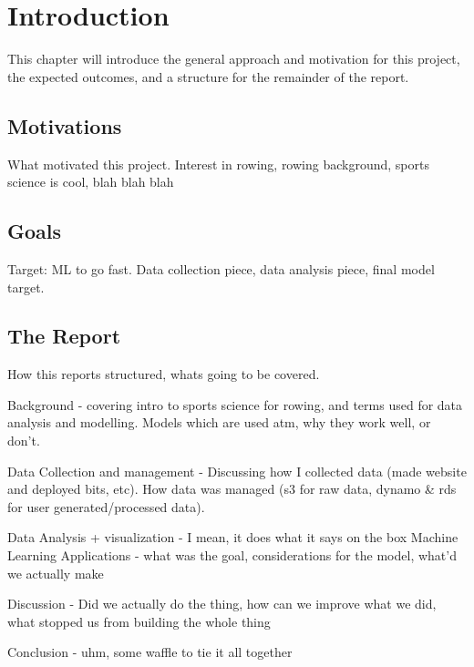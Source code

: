 \chapter{Introduction}
This chapter will introduce the general approach and motivation for this project, the expected outcomes, and a structure for the remainder of the report.

\section{Motivations}
What motivated this project. Interest in rowing, rowing background, sports science is cool, blah blah blah
\section{Goals}
Target: ML to go fast. Data collection piece, data analysis piece, final model target.

\section{The Report}
How this reports structured, whats going to be covered.

Background - covering intro to sports science for rowing, and terms used for data analysis and modelling. Models which are used atm, why they work well, or don't.

Data Collection and management - Discussing how I collected data (made website and deployed bits, etc). How data was managed (s3 for raw data, dynamo \& rds for user generated/processed data).

Data Analysis + visualization - I mean, it does what it says on the box
Machine Learning Applications - what was the goal, considerations for the model, what'd we actually make

Discussion - Did we actually do the thing, how can we improve what we did, what stopped us from building the whole thing

Conclusion - uhm, some waffle to tie it all together

